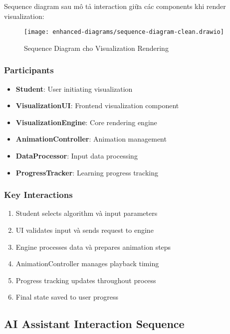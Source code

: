 Sequence diagram sau mô tả interaction giữa các components khi render visualization:

\begin{figure}[H]
\centering
\texttt{[image: enhanced-diagrams/sequence-diagram-clean.drawio]}
\caption{Sequence Diagram cho Visualization Rendering}
\label{fig:sequence-viz}
\end{figure}

\subsubsection{Participants}

\begin{itemize}
    \item \textbf{Student}: User initiating visualization
    \item \textbf{VisualizationUI}: Frontend visualization component
    \item \textbf{VisualizationEngine}: Core rendering engine
    \item \textbf{AnimationController}: Animation management
    \item \textbf{DataProcessor}: Input data processing
    \item \textbf{ProgressTracker}: Learning progress tracking
\end{itemize}

\subsubsection{Key Interactions}

\begin{enumerate}
    \item Student selects algorithm và input parameters
    \item UI validates input và sends request to engine
    \item Engine processes data và prepares animation steps
    \item AnimationController manages playback timing
    \item Progress tracking updates throughout process
    \item Final state saved to user progress
\end{enumerate}

\subsection{AI Assistant Interaction Sequence}
\label{subsec:ai-sequence}

